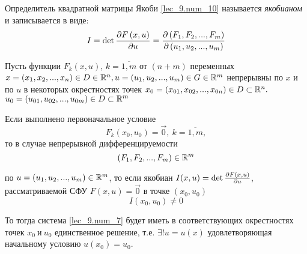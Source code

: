 \documentclass[../../main.tex]{subfiles}
\begin{document}
Определитель квадратной матрицы Якоби 
    \eqref{lec_9.num_10} называется \emph{якобианом}
и записывается в виде:
\begin{equation}
    \label{lec_9.num_11}   
    I = \det\frac{\partial F\left(x,u\right)}{\partial u} =
    \frac{\partial \left(F_1,F_2,...,F_m\right)}{\partial \left(u_1, u_2,..., u_m\right)}
\end{equation}

\begin{thm}
Пусть функции $F_k\left(x, u\right)$, $k = \overline{1, m}$
от $(n+ m)$ переменных 
$x = \left(x_1, x_2, ..., x_n\right) \in D \in \mathbb{R}^n,
u = \left(u_1, u_2, ..., u_m\right) \in G \in \mathbb{R}^m$
непрерывны по $x$ и по $u$ в некоторых окрестностях точек
$x_0 = \left(x_{01}, x_{02}, ..., x_{0n}\right) \in D 
\subset \mathbb{R}^n. $
$u_0 = \left(u_{01}, u_{02}, ..., u_{0m}\right) \in D
\subset \mathbb{R}^m$

Если выполнено первоначальное условие
\begin{equation}
    \label{lec_9.num_12}
    F_k(x_0, u_0) = \vec{0},\ k = \overline{1, m},
\end{equation}
то в случае непрерывной дифференцируемости
\begin{equation}
    \label{lec_9.num_13}
    \left(F_1, F_2, ..., F_m\right) \in \mathbb{R}^m
\end{equation}

по $u = \left(u_1, u_2, ..., u_m\right) \in \mathbb{R}^m$,
то если якобиан
$I(x, u) = \det\frac{\partial F\left(x, u\right)}{\partial u}$, 
рассматриваемой СФУ $F\left(x, u\right) = \vec{0}$
в точке $\left(x_0, u_0\right)$
\begin{equation}
    \label{lec_9.num_14}
    I(x_0, u_0) \neq 0 
\end{equation}

То тогда система \eqref{lec_9.num_7} будет иметь в 
соответствующих окрестностях точек $x_0\ \text{и}\ u_0$
единственное решение, т.е. $\exists!u = u(x)$ удовлетворяющая начальному
 условию $u(x_0) = u_0$.
\end{thm}
\end{document}
